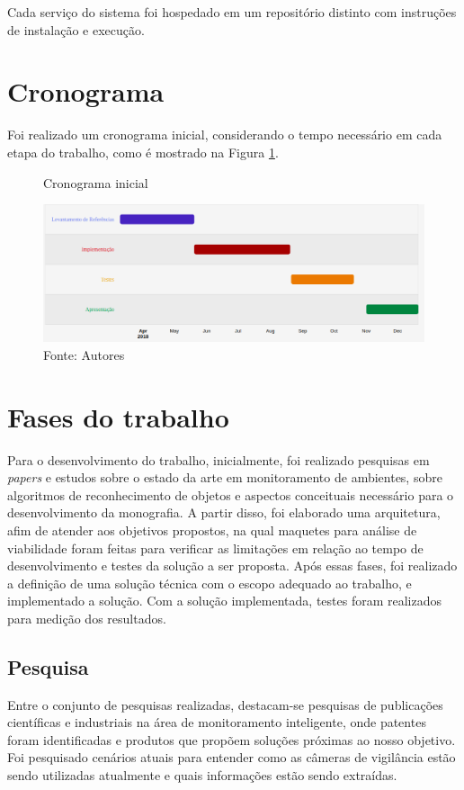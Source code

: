 \documentclass[]{politex}
\begin{document}
Cada serviço do sistema foi hospedado em um repositório distinto com instruções de instalação e execução.

\section{Cronograma}
Foi realizado um cronograma inicial, considerando o tempo necessário em cada etapa do trabalho, como é mostrado na Figura \ref{fig:cronograma}.

\begin{figure}[H]
    \centering
    \caption{Cronograma inicial}
    \includegraphics[width=\textwidth]{metodologia_gantt}
    \caption*{Fonte: Autores}
    \label{fig:cronograma}
\end{figure}

\section{Fases do trabalho}
Para o desenvolvimento do trabalho, inicialmente, foi realizado  pesquisas em \textit{papers} e estudos sobre o estado da arte em monitoramento de ambientes, sobre algoritmos de reconhecimento de objetos e aspectos conceituais necessário para o desenvolvimento da monografia. A partir disso, foi elaborado uma arquitetura, afim de atender aos objetivos propostos, na qual maquetes para análise de viabilidade foram feitas para verificar as limitações em relação ao tempo de desenvolvimento e testes da solução a ser proposta. Após essas fases, foi realizado a definição de uma solução técnica com o escopo adequado ao trabalho, e implementado a solução. Com a solução implementada, testes foram realizados para medição dos resultados.

\subsection{Pesquisa}
Entre o conjunto de pesquisas realizadas, destacam-se pesquisas de publicações científicas e industriais na área de monitoramento inteligente, onde patentes foram identificadas e produtos que propõem soluções próximas ao nosso objetivo. Foi pesquisado cenários atuais para entender como as câmeras de vigilância estão sendo utilizadas atualmente e quais informações estão sendo extraídas.
\end{document}
